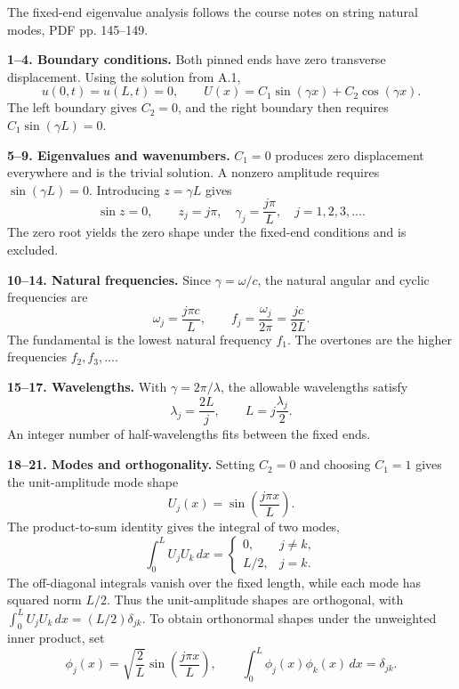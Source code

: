 The fixed-end eigenvalue analysis follows the course notes on string natural modes, PDF pp. 145--149.

\textbf{1--4. Boundary conditions.} Both pinned ends have zero transverse displacement. Using the solution from A.1,
\[
u(0,t)=u(L,t)=0,\qquad
U(x)=C_1\sin(\gamma x)+C_2\cos(\gamma x).
\]
The left boundary gives $C_2=0$, and the right boundary then requires $C_1\sin(\gamma L)=0$.

\textbf{5--9. Eigenvalues and wavenumbers.} $C_1=0$ produces zero displacement everywhere and is the trivial solution. A nonzero amplitude requires $\sin(\gamma L)=0$. Introducing $z=\gamma L$ gives
\[
\sin z=0,\qquad \boxed{z_j=j\pi,\quad
\gamma_j=\frac{j\pi}{L},\quad j=1,2,3,\ldots.}
\]
The zero root yields the zero shape under the fixed-end conditions and is excluded.

\textbf{10--14. Natural frequencies.} Since $\gamma=\omega/c$, the natural angular and cyclic frequencies are
\[
\boxed{\omega_j=\frac{j\pi c}{L},\qquad f_j=\frac{\omega_j}{2\pi}=\frac{jc}{2L}.}
\]
The fundamental is the lowest natural frequency $f_1$. The overtones are the higher frequencies $f_2,f_3,\ldots$.

\textbf{15--17. Wavelengths.} With $\gamma=2\pi/\lambda$, the allowable wavelengths satisfy
\[
\boxed{\lambda_j=\frac{2L}{j},\qquad L=j\frac{\lambda_j}{2}.}
\]
An integer number of half-wavelengths fits between the fixed ends.

\textbf{18--21. Modes and orthogonality.} Setting $C_2=0$ and choosing $C_1=1$ gives the unit-amplitude mode shape
\[
U_j(x)=\sin\left(\frac{j\pi x}{L}\right).
\]
The product-to-sum identity gives the integral of two modes,
\[
\int_0^L U_jU_k\,dx=
\begin{cases}
0,&j\ne k,\\
L/2,&j=k.
\end{cases}
\]
The off-diagonal integrals vanish over the fixed length, while each mode has squared norm $L/2$. Thus the unit-amplitude shapes are orthogonal, with $\int_0^L U_jU_k\,dx=(L/2)\delta_{jk}$. To obtain orthonormal shapes under the unweighted inner product, set
\[
\phi_j(x)=\sqrt{\frac{2}{L}}\sin\left(\frac{j\pi x}{L}\right),
\qquad \boxed{\int_0^L\phi_j(x)\phi_k(x)\,dx=\delta_{jk}.}
\]
